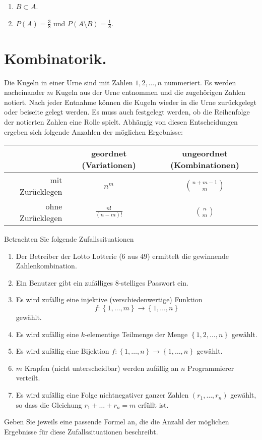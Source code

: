 \solution
\begin{enumerate}
    \item $B \subset A$.

    \item $P(A) = \frac{3}{8}$ und $P(A \setminus B) = \frac{1}{8}$.
\end{enumerate}



\section{Kombinatorik.}

Die Kugeln in einer Urne sind mit Zahlen $1,2,\dots, n$ nummeriert. Es werden
nacheinander $m$ Kugeln aus der Urne entnommen und die zugehörigen Zahlen
notiert. Nach jeder Entnahme können die Kugeln wieder in die Urne zurückgelegt
oder beiseite gelegt werden. Es muss auch festgelegt werden, ob die Reihenfolge
der notierten Zahlen eine Rolle spielt. Abhängig von diesen Entscheidungen 
ergeben sich folgende Anzahlen der möglichen Ergebnisse:
\begin{center}
\begin{tabular}{ | r | c | c |}
    \hline
    & geordnet (Variationen) & ungeordnet (Kombinationen) \\
    \hline
    mit Zurücklegen & $n^{m}$ & $\binom{n+m-1}{m}$ \\
    \hline
    ohne Zurücklegen & $\frac{n!}{(n-m)!}$ & $\binom{n}{m}$ \\
    \hline
\end{tabular}
\end{center}
Betrachten Sie folgende Zufallssituationen
\begin{enumerate}
    \item Der Betreiber der Lotto Lotterie ($6$ aus $49$) ermittelt die gewinnende
        Zahlenkombination.
    \item Ein Benutzer gibt ein zufälliges $8$-stelliges Passwort ein.
    \item Es wird zufällig eine injektive (verschiedenwertige) Funktion \[f:
        \left\{ 1,\dots ,m \right\} \to \left\{ 1,\dots ,n \right\}\] gewählt.
    \item Es wird zufällig eine $k$-elementige Teilmenge der Menge $\left\{
        1,2,\dots ,n \right\}$ gewählt.
    \item Es wird zufällig eine Bijektion $f: \left\{ 1,\dots ,n \right\}\to
        \left\{ 1,\dots ,n \right\}$ gewählt. 
    \item $m$ Krapfen (nicht unterscheidbar) werden zufällig an $n$
        Programmierer verteilt. 
    \item Es wird zufällig eine Folge nichtnegativer ganzer Zahlen $\left(
        r_{1},\dots ,r_{n} \right)$ gewählt, so dass die Gleichung $r_{1}+
        \dots + r_{n} = m$ erfüllt ist. 
\end{enumerate}
Geben Sie jeweils eine passende Formel an, die die Anzahl der möglichen
Ergebnisse für diese Zufallssituationen beschreibt. 

